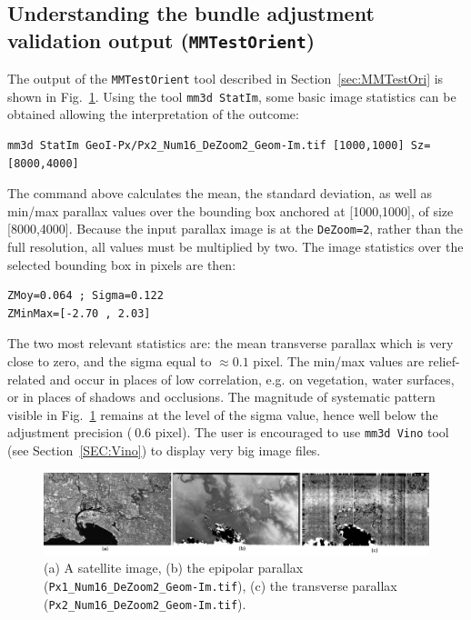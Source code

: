 \subsection{Understanding the bundle adjustment validation output ({\tt MMTestOrient})}
% 
The output of the {\tt MMTestOrient} tool described in Section~\ref{sec:MMTestOri} is shown in Fig.~\ref{fig:satMMTestOri}. Using the tool {\tt mm3d StatIm}, some basic image statistics can be obtained allowing the interpretation of the outcome:
\begin{verbatim}
mm3d StatIm GeoI-Px/Px2_Num16_DeZoom2_Geom-Im.tif [1000,1000] Sz=[8000,4000]
\end{verbatim}
%
The command above calculates the mean, the standard deviation, as well as min/max parallax values over the bounding box anchored at [1000,1000], of size [8000,4000]. Because the input parallax image is at the \texttt{DeZoom=2}, rather than the full resolution, all values must be multiplied by two. The image statistics over the selected bounding box in pixels are then:
\begin{verbatim}
ZMoy=0.064 ; Sigma=0.122
ZMinMax=[-2.70 , 2.03]
\end{verbatim}
%   
The two most relevant statistics are: the mean transverse parallax which is very close to zero, and the sigma equal to $\approx 0.1$ pixel. The min/max values are relief-related and occur in places of low correlation, e.g. on vegetation, water surfaces, or in places of shadows and occlusions. The magnitude of systematic pattern visible in Fig.~\ref{fig:satMMTestOri} remains at the level of the sigma value, hence well below the adjustment precision ($~0.6$ pixel). The user is encouraged to use \texttt{mm3d Vino} tool (see Section~\ref{SEC:Vino}) to display very big image files.
%
\begin{figure}[h!]
\centering
\includegraphics[width=0.95\linewidth]{FIGS/Satellites/IMG_Px1_Px2_Num16.png}
\caption{(a) A satellite image, (b) the epipolar parallax (\texttt{Px1\_Num16\_DeZoom2\_Geom-Im.tif}), (c) the transverse parallax (\texttt{Px2\_Num16\_DeZoom2\_Geom-Im.tif}).}
\label{fig:satMMTestOri}
\end{figure}


